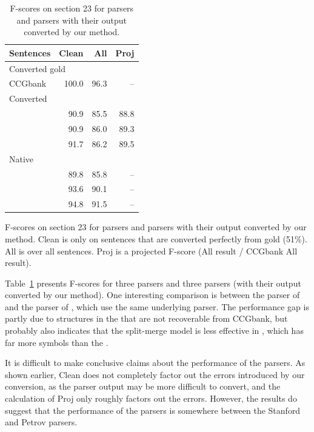 \begin{table}
\centering
\begin{tabular}{lrr|r}
	\hline
	Sentences & Clean & All & Proj \\
	\hline
	\hline
		\multicolumn{2}{l}{Converted gold \ccg} & & \\
		CCGbank & \hspace{0mm}100.0 & \hspace{0mm}96.3 & -- \\
	\hline
		\multicolumn{2}{l}{Converted \ccg} & & \\
		\textcite{Clark-Curran:2007} & 90.9 & 85.5 & 88.8 \\
		\textcite{Fowler-Penn:2010} & 90.9 & 86.0 & 89.3 \\
		\textcite{Auli-Lopez:2011} & 91.7 & 86.2 & 89.5 \\
	\hline
		\multicolumn{2}{l}{Native \ptb} & & \\
		\textcite{Klein-Manning:2003:ACL} & 89.8 & 85.8 & -- \\
		\textcite{Petrov-Klein:2007} & 93.6 & 90.1 & -- \\
		\textcite{Charniak-Johnson:2005} & 94.8 & 91.5 & -- \\
	\hline
\end{tabular}
\caption{
	\label{tab:full-comp}
	F-scores on section 23 for \ptb parsers and \ccg parsers with their output converted by our method.
}{
	F-scores on section 23 for \ptb parsers and \ccg parsers with their output converted by our method.
	Clean is only on sentences that are converted perfectly from gold \ccg (51\%).
	All is over all sentences.
	Proj is a projected F-score (All result / CCGbank All result).
}
\end{table}

Table~\ref{tab:full-comp} presents F-scores for three \ptb parsers and three
\ccg parsers (with their output converted by our method).  One interesting
comparison is between the \ptb parser of \textcite{Petrov-Klein:2007} and the
\ccg parser of \textcite{Fowler-Penn:2010}, which use the same underlying
parser.  The performance gap is partly due to structures in the \ptb that are
not recoverable from CCGbank, but probably also indicates that the split-merge
model is less effective in \ccg, which has far more symbols than the \ptb.

It is difficult to make conclusive claims about the performance of the parsers.
As shown earlier, Clean does not completely factor out the errors
introduced by our conversion, as the parser output may be more difficult to
convert, and the calculation of Proj only roughly factors out the
errors.  However, the results do suggest that the performance of the \ccg
parsers is somewhere between the Stanford and Petrov parsers.

